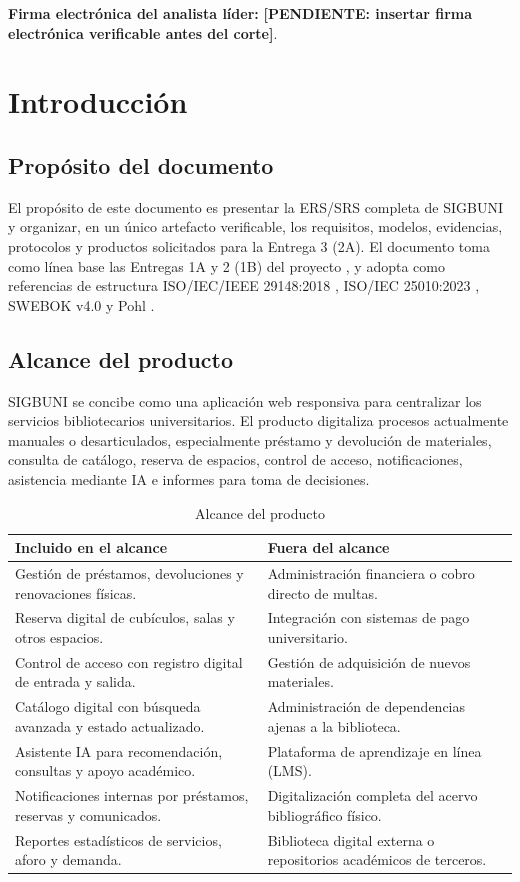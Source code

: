 \documentclass[12pt,journal,onecolumn]{IEEEtran}
\newcommand{\pendiente}[1]{\textcolor{red!70!black}{\textbf{[PENDIENTE: #1]}}}
\begin{document}
\vspace{1em}
\textbf{Firma electrónica del analista líder:} \pendiente{insertar firma electrónica verificable antes del corte}.

\tableofcontents
\listoffigures
\listoftables
\clearpage

\section{Introducción}
\subsection{Propósito del documento}
El propósito de este documento es presentar la ERS/SRS completa de SIGBUNI y organizar, en un único artefacto verificable, los requisitos, modelos, evidencias, protocolos y productos solicitados para la Entrega 3 (2A). El documento toma como línea base las Entregas 1A y 2 (1B) del proyecto \cite{sigbuni1a2026,sigbuni1b2026}, y adopta como referencias de estructura ISO/IEC/IEEE 29148:2018 \cite{iso29148_2018}, ISO/IEC 25010:2023 \cite{iso25010_2023}, SWEBOK v4.0 \cite{swebok2024} y Pohl \cite{pohl2010}.

\subsection{Alcance del producto}
SIGBUNI se concibe como una aplicación web responsiva para centralizar los servicios bibliotecarios universitarios. El producto digitaliza procesos actualmente manuales o desarticulados, especialmente préstamo y devolución de materiales, consulta de catálogo, reserva de espacios, control de acceso, notificaciones, asistencia mediante IA e informes para toma de decisiones.

\begin{table}[H]\centering
\caption{Alcance del producto}
\begin{tabularx}{\textwidth}{Y Y}\toprule
\textbf{Incluido en el alcance} & \textbf{Fuera del alcance}\\\midrule
Gestión de préstamos, devoluciones y renovaciones físicas. & Administración financiera o cobro directo de multas.\\
Reserva digital de cubículos, salas y otros espacios. & Integración con sistemas de pago universitario.\\
Control de acceso con registro digital de entrada y salida. & Gestión de adquisición de nuevos materiales.\\
Catálogo digital con búsqueda avanzada y estado actualizado. & Administración de dependencias ajenas a la biblioteca.\\
Asistente IA para recomendación, consultas y apoyo académico. & Plataforma de aprendizaje en línea (LMS).\\
Notificaciones internas por préstamos, reservas y comunicados. & Digitalización completa del acervo bibliográfico físico.\\
Reportes estadísticos de servicios, aforo y demanda. & Biblioteca digital externa o repositorios académicos de terceros.\\\bottomrule
\end{tabularx}
\end{table}
\end{document}

